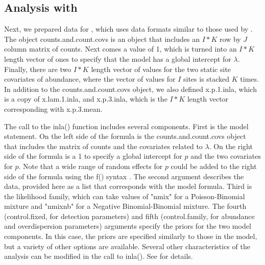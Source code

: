 \documentclass[article]{jss}
\begin{document}
\subsection[Analysis with R-INLA]{Analysis with }
Next, we prepared data for , which uses data formats similar to those used by . The object counts.and.count.covs is an  object that includes an $I*K$ row by $J$ column matrix of counts. Next comes a value of 1, which is turned into an $I*K$ length vector of ones to specify that the model has a global intercept for $\lambda$. Finally, there are two $I*K$ length vector of values for the two static site covariates of abundance, where the vector of values for $I$ sites is stacked $K$ times. In addition to the counts.and.count.covs object, we also defined x.p.1.inla, which is a copy of x.lam.1.inla, and x.p.3.inla, which is the $I*K$ length vector corresponding with x.p.3.mean.


The call to the inla() function includes several components. First is the model statement. On the left side of the formula is the counts.and.count.covs object that includes the matrix of counts and the covariates related to $\lambda$.  On the right side of the formula is a 1 to specify a global intercept for $p$ and the two covariates for $p$.  Note that a wide range of random effects for $p$ could be added to the right side of the formula using the f() syntax \citep{Rue_Martino_Lindgren_Simpson_Riebler_2013}. The second argument describes the data, provided here as a list that corresponds with the model formula. Third is the likelihood family, which can take values of "nmix" for a Poisson-Binomial mixture and "nmixnb" for a Negative Binomial-Binomial mixture. The fourth (control.fixed, for detection parameters) and fifth (control.family, for abundance and overdispersion parameters) arguments specify the priors for the two model components. In this case, the priors are specified similarly to those in the  model, but a variety of other options are available. Several other characteristics of the analysis can be modified in the call to inla(). See \cite{Rue_Martino_Lindgren_Simpson_Riebler_2013} for details.
\end{document}
